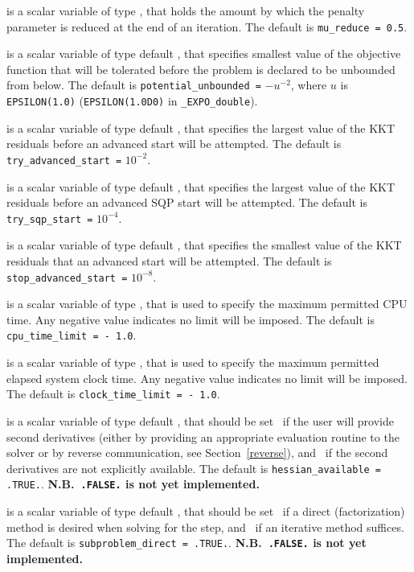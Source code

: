 \documentclass{galahad}
\newcommand{\packagename}{EXPO}
\newcommand{\fullpackagename}{\libraryname\_\packagename}
\begin{document}
\begin{description}
 is a scalar variable of type \realdp, that holds
the amount by which the penalty parameter is reduced at the end of 
an iteration.
The default is {\tt mu\_reduce = 0.5}.

 is a scalar variable of type default \realdp, that 
specifies smallest
value of the objective function that will be tolerated before the problem
is declared to be unbounded from below.
The default is {\tt potential\_u\-nbounded =} $-u^{-2}$,
where $u$ is {\tt EPSILON(1.0)} ({\tt EPSILON(1.0D0)} in
{\tt \fullpackagename\_double}).

 is a scalar variable of type default \realdp, that 
specifies the largest value of the KKT residuals before an advanced start 
will be attempted.
The default is {\tt try\_advanced\_start =} $10^{-2}$.

 is a scalar variable of type default \realdp, that 
specifies the largest value of the KKT residuals before an advanced SQP start 
will be attempted.
The default is {\tt try\_sqp\_start =} $10^{-4}$.

 is a scalar variable of type default \realdp, that 
specifies the smallest value of the KKT residuals that an advanced start 
will be attempted.
The default is {\tt stop\_advanced\_start =} $10^{-8}$.

 is a scalar variable of type \realdp,
that is used to specify the maximum permitted CPU time. Any negative
value indicates no limit will be imposed. The default is
{\tt cpu\_time\_limit = - 1.0}.

 is a scalar variable of type \realdp,
that is used to specify the maximum permitted elapsed system clock time.
Any negative value indicates no limit will be imposed. The default is
{\tt clock\_time\_limit = - 1.0}.

is a scalar variable of type default \logical,
that should be set \true\ if the user will provide second derivatives
(either by providing an appropriate evaluation routine to the solver
or by reverse communication, see Section~\ref{reverse}), and
\false\ if the second derivatives are not explicitly available.
The default is {\tt hessian\_available = .TRUE.}. 
{\bf N.B.\ {\tt .FALSE.} is not yet implemented.}

is a scalar variable of type default \logical,
that should be set \true\ if a direct (factorization) method is
desired when solving for the step, and \false\ if an iterative
method suffices.
The default is {\tt subproblem\_direct = .TRUE.}.
{\bf N.B.\ {\tt .FALSE.} is not yet implemented.}


\end{description}
\end{document}
